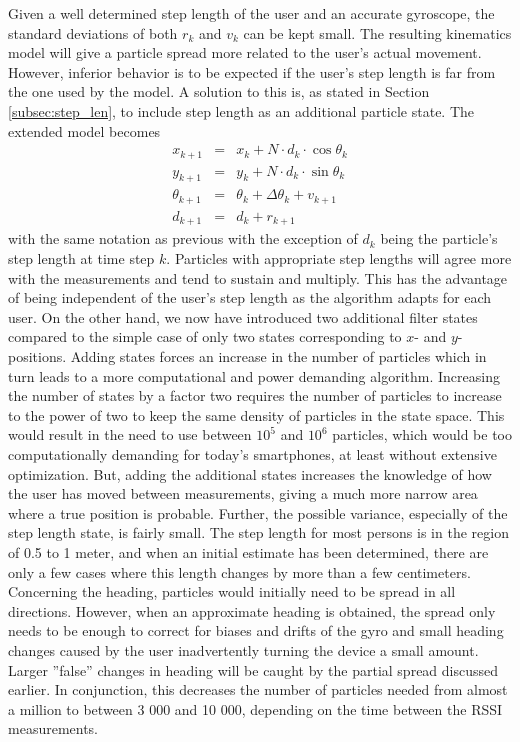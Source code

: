 \documentclass{LTHthesis}
\begin{document}
Given a well determined step length of the user and an accurate gyroscope, the standard deviations of both $r_k$ and $v_k$ can be kept small. The resulting kinematics model will give a particle spread more related to the user's actual movement. However, inferior behavior is to be expected if the user's step length is far from the one used by the model. A solution to this is, as stated in Section \ref{subsec:step_len}, to include step length as an additional particle state. The extended model becomes
%
\begin{eqnarray}
x_{k+1} &  = & x_k + N\cdot d_k\cdot\cos{\theta_k} \nonumber\\
y_{k+1} & = &y_k + N\cdot d_k\cdot\sin{\theta_k}\label{eq:heading_step_len_kin_mod}\\
\theta_{k+1} & = & \theta_k +\Delta\theta_k+ v_{k+1} \nonumber \\
d_{k+1} & = & d_k + r_{k+1}\nonumber
\end{eqnarray}  
%
with the same notation as previous with the exception of $d_k$ being the particle's step length at time step $k$. Particles with appropriate step lengths will agree more with the measurements and tend to sustain and multiply. This has the advantage of being independent of the user's step length as the algorithm adapts for each user. On the other hand, we now have introduced two additional filter states compared to the simple case of only two states corresponding to $x$- and $y$-positions. Adding states forces an increase in the number of particles which in turn leads to a more computational and power demanding algorithm. Increasing the number of states by a factor two requires the number of particles to increase to the power of two to keep the same density of particles in the state space. This would result in the need to use between $10^{5}$ and $10^{6}$ particles, which would be too computationally demanding for today's smartphones, at least without extensive optimization. But, adding the additional states increases the knowledge of how the user has moved between measurements, giving a much more narrow area where a true position is probable. Further, the possible variance, especially of the step length state, is fairly small. The step length for most persons is in the region of 0.5 to 1 meter, and when an initial estimate has been determined, there are only a few cases where this length changes by more than a few centimeters. Concerning the heading, particles would initially need to be spread in all directions. However, when an approximate heading is obtained, the spread only needs to be enough to correct for biases and drifts of the gyro and small heading changes caused by the user inadvertently turning the device a small amount. Larger ''false'' changes in heading will be caught by the partial spread discussed earlier. In conjunction, this decreases the number of particles needed from almost a million to between 3 000 and 10 000, depending on the time between the RSSI measurements.       
%
\end{document}
